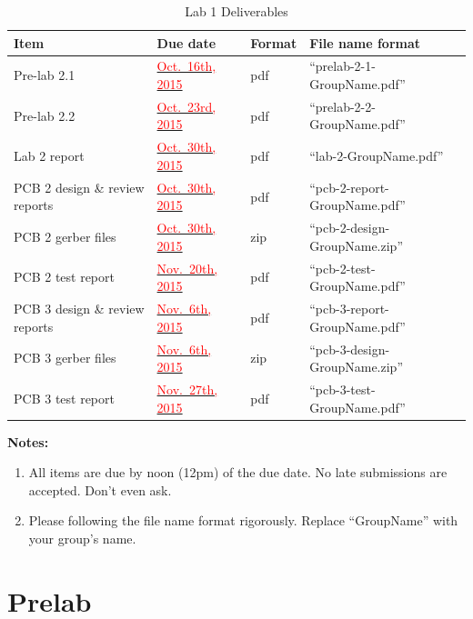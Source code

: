 \documentclass[letterpaper, 11pt]{article}
\newcommand{\due}[1]{\href{https://github.com/ucdart/UCD-EEC134/blob/master/support/schedule/eec134-schedule.pdf}{\textcolor{red}{#1}}}
\begin{document}
\vspace{0.5cm}

\begin{table}[h]
	\footnotesize
	\caption{Lab 1 Deliverables}
	\renewcommand{\arraystretch}{1.2}
	\begin{tabular}{|m{1in}|l|m{0.45in}|m{2in}|}
		\hline
		\textbf{Item} & \textbf{Due date} & \textbf{Format} & \textbf{File name format} \\
		\hline \hline
		Pre-lab 2.1 & \due{Oct.~16th, 2015} & pdf & ``prelab-2-1-GroupName.pdf'' \\
		\hline
		Pre-lab 2.2 & \due{Oct.~23rd, 2015} & pdf & ``prelab-2-2-GroupName.pdf''\\
		\hline
		Lab 2 report & \due{Oct.~30th, 2015} & pdf & ``lab-2-GroupName.pdf''\\
		\hline
		PCB 2 design \& review reports & \due{Oct.~30th, 2015} & pdf & ``pcb-2-report-GroupName.pdf''\\
		\hline
		PCB 2 gerber files & \due{Oct.~30th, 2015} & zip & ``pcb-2-design-GroupName.zip''\\
		\hline
		PCB 2 test report & \due{Nov.~20th, 2015} & pdf & ``pcb-2-test-GroupName.pdf''\\
		\hline
		PCB 3 design \& review reports & \due{Nov.~6th, 2015} & pdf & ``pcb-3-report-GroupName.pdf''\\
		\hline
		PCB 3 gerber files & \due{Nov.~6th, 2015} & zip & ``pcb-3-design-GroupName.zip''\\
		\hline
		PCB 3 test report & \due{Nov.~27th, 2015} & pdf & ``pcb-3-test-GroupName.pdf''\\
		\hline
	\end{tabular}
	\label{tab:deliverables}
\end{table}

\textbf{Notes:}
\begin{enumerate}
	\item All items are due by noon (12pm) of the due date. No late submissions are accepted. Don't even ask. 
	
	\item Please following the file name format rigorously. Replace ``GroupName'' with your group's name. 
	
\end{enumerate}
	
\newpage
\section{Prelab}
\end{document}
